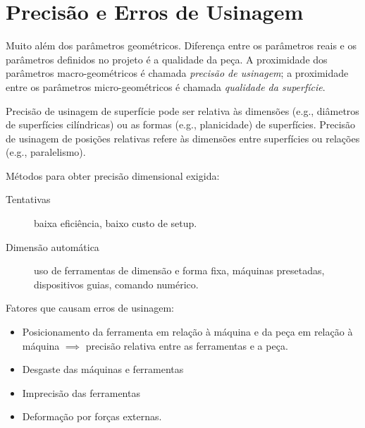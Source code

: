 \documentclass[a4paper]{report}
\begin{document}
\section*{Precisão e Erros de Usinagem}

Muito além dos parâmetros geométricos. Diferença entre os parâmetros reais e os parâmetros definidos no projeto é a qualidade da peça. A proximidade dos parâmetros macro-geométricos é chamada \emph{precisão de usinagem}; a proximidade entre os parâmetros micro-geométricos é chamada \emph{qualidade da superfície}.

Precisão de usinagem de superfície pode ser relativa às dimensões (e.g., diâmetros de superfícies cilíndricas) ou as formas (e.g., planicidade) de superfícies. Precisão de usinagem de posições relativas refere às dimensões entre superfícies ou relações (e.g., paralelismo).

Métodos para obter precisão dimensional exigida:
\begin{description}
    \item[Tentativas] baixa eficiência, baixo custo de setup.
    \item[Dimensão automática] uso de ferramentas de dimensão e forma fixa, máquinas presetadas, dispositivos guias, comando numérico.
\end{description}

Fatores que causam erros de usinagem:
\begin{itemize}
    \item Posicionamento da ferramenta em relação à máquina e da peça em relação à máquina $\implies$ precisão relativa entre as ferramentas e a peça.
	\item Desgaste das máquinas e ferramentas
	    \item Imprecisão das ferramentas
		\item Deformação por forças externas.
\end{itemize}
\end{document}
